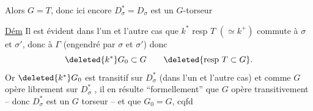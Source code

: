 Alors $G=T$, donc ici encore  $D_\sigma^*=D_\sigma$ est un $G$-torseur

\uline{Dém} Il est évident dans l'un et l'autre cas que  $k^*$ resp $T$ $(\simeq k^{+})$ commute à $\sigma$ et $\sigma'$, donc à $\Gamma$ (engendré par $\sigma$ et $\sigma'$) donc
\[
\deleted{k^*}G_0\subset G\qquad\deleted{\text{resp } T\subset G}.
\]
Or $\deleted{k^*}G_0$ est transitif sur $D_\sigma^*$  (dans l'un et l'autre cas) et comme $G$  opère librement sur $D_\sigma^*$ , il en résulte ``formellement'' que $G$ opère transitivement -- donc $D_\sigma^*$ est un $G$ torseur -- et que $G_0=G$, cqfd
